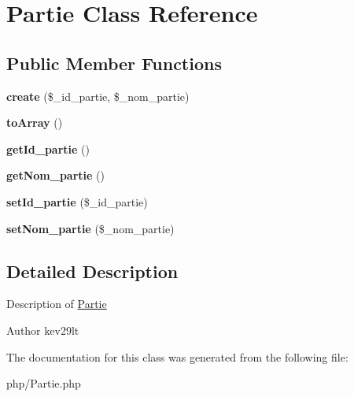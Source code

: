 \hypertarget{class_partie}{}\section{Partie Class Reference}
\label{class_partie}
\subsection*{Public Member Functions}
\begin{DoxyCompactItemize}
\item 
\mbox{\label{class_partie_a95282fb88b442c0ee57ed1933874c363}} 
{\bfseries create} (\$\+\_\+id\+\_\+partie, \$\+\_\+nom\+\_\+partie)
\item 
\mbox{\label{class_partie_a658defb34762c8f40085aec87e16ba1a}} 
{\bfseries to\+Array} ()
\item 
\mbox{\label{class_partie_a3212f8c90b6adb064d0b70929dfeec4a}} 
{\bfseries get\+Id\+\_\+partie} ()
\item 
\mbox{\label{class_partie_a953093d15d493a9958669ca3e9e8f239}} 
{\bfseries get\+Nom\+\_\+partie} ()
\item 
\mbox{\label{class_partie_a1c24bab5533c42a8a90d81053e39f92e}} 
{\bfseries set\+Id\+\_\+partie} (\$\+\_\+id\+\_\+partie)
\item 
\mbox{\label{class_partie_af6c36317202690a956691f87d607188c}} 
{\bfseries set\+Nom\+\_\+partie} (\$\+\_\+nom\+\_\+partie)
\end{DoxyCompactItemize}


\subsection{Detailed Description}
Description of \mbox{\hyperlink{class_partie}{Partie}}

\begin{DoxyAuthor}{Author}
kev29lt 
\end{DoxyAuthor}


The documentation for this class was generated from the following file\+:\begin{DoxyCompactItemize}
\item 
php/Partie.\+php\end{DoxyCompactItemize}
